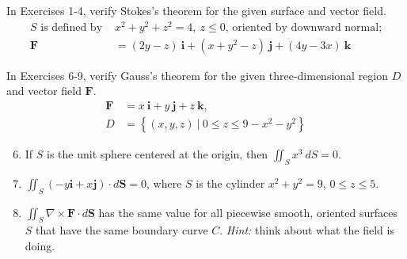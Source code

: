 \documentclass[12pt,letterpaper]{hmcpset}
\newcommand{\set}[1]{\left\{#1\right\}}
\renewcommand{\bf}[1]{\mathbf{#1}}
\begin{document}
\begin{problem}[Colley 7.3.4]
    In Exercises 1-4, verify Stokes's theorem for the given surface
    and vector field.
    \begin{align*}
        S\text{ is defined by }&x^2+y^2+z^2=4,~z\leq0\text{, oriented
        by downward normal;}\\
        \bf{F}&=(2y-z)~\bf{i}+(x+y^2-z)~\bf{j}+(4y-3x)~\bf{k}
    \end{align*}
\end{problem}
\begin{solution}
    \vfill
\end{solution}
\newpage

\begin{problem}[Colley 7.3.6]
    In Exercises 6-9, verify Gauss's theorem for the given
    three-dimensional region $D$ and vector field $\bf{F}$.
    \begin{align*}
        \bf{F}&=x~\bf{i}+y~\bf{j}+z~\bf{k},\\
        D&=\set{(x,y,z)~|~0\leq z\leq9-x^2-y^2}
    \end{align*}
\end{problem}
\begin{solution}
    \vfill
\end{solution}
\newpage

\begin{problem}
    \begin{enumerate}[label=\textbf{\arabic*.}]
        \setcounter{enumi}{5}
        \item If $S$ is the unit sphere centered at the origin, then
            $\iint_Sx^3~dS=0$.
        \setcounter{enumi}{9}
        \item $\iint_S(-y\bf{i}+x\bf{j})\cdot d\bf{S}=0$, where $S$ is
            the cylinder $x^2+y^2=9$, $0\leq z\leq5$.
        \setcounter{enumi}{17}
        \item $\iint_S\nabla\times\bf{F}\cdot d\bf{S}$ has the same
            value for all piecewise smooth, oriented surfaces $S$ that
            have the same boundary curve $C$.
            \textit{Hint:} think about what the field is doing.
    \end{enumerate}
\end{problem}
\begin{solution}
    \vfill
\end{solution}
\end{document}
